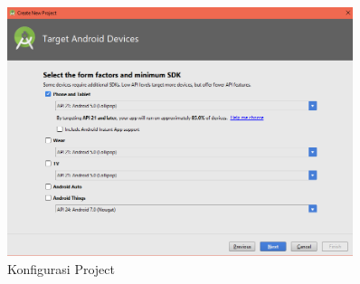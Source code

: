 \begin{enumerate}
\begin{enumerate}
         \begin{figure}[H]
        \centering
        \includegraphics[width=0.9\textwidth]{figures/android26.png}
        \caption{Konfigurasi Project}
        \label{print}
        \end{figure}
  

\end{enumerate}
\end{enumerate}
